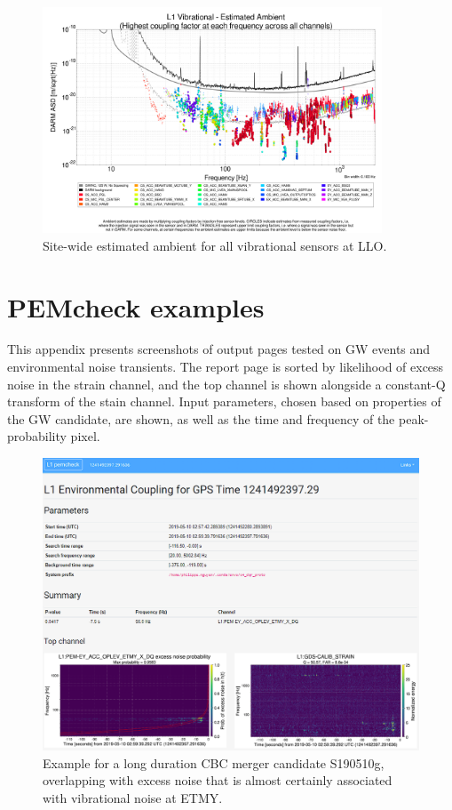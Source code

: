 \begin{figure}
  \centering
  \includegraphics[width=0.9\textwidth]{figures/appendix/pemcoupling-sitewide-ambient.png}
  \caption{Site-wide estimated ambient for all vibrational sensors at LLO.}
  \label{fig:pemcoupling-sitewide-ambient}
\end{figure}


\setcounter{figure}{0}
\setcounter{table}{0}

\chapter{PEMcheck examples}\label{app:pemcheck}

This appendix presents screenshots of  output pages tested on GW events and environmental noise transients.
The report page is sorted by likelihood of excess noise in the strain channel, and the top channel is shown alongside a constant-Q transform of the stain channel.
Input parameters, chosen based on properties of the GW candidate, are shown, as well as the time and frequency of the peak-probability pixel.

\begin{figure}[!h]
  \centering
  \includegraphics[width=\textwidth]{figures/appendix/pemcheck-s190510g.png}
  \caption{Example for a long duration CBC merger candidate S190510g, overlapping with excess noise that is almost certainly associated with vibrational noise at ETMY.}
  \label{fig:pemcheck-s190510g}
\end{figure}

